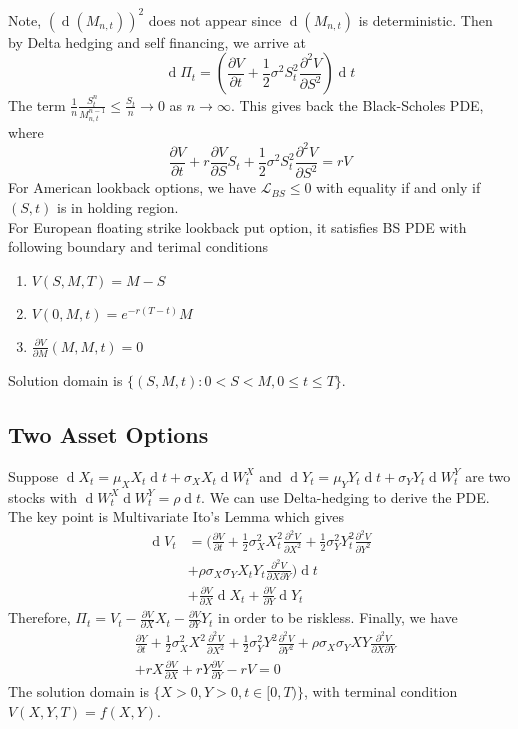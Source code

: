 \documentclass[12pt]{article}
\theoremstyle{definition}
\DeclareMathOperator{\diff}{d}
\begin{document}
Note, $(\diff(M_{n,t}))^2$ does not appear since $\diff(M_{n,t})$ is deterministic. Then by Delta hedging and self financing, we arrive at \[
\diff \Pi_t=(\frac{\partial V}{\partial t}+\frac{1}{2}\sigma^2 S_t^2\frac{\partial^2 V}{\partial S^2})\diff t
\]
The term $\frac{1}{n}\frac{S_t^n}{M_{n,t}^{n-1}}\leq \frac{S_t}{n}\to 0$ as $n\to\infty$. This gives back the Black-Scholes PDE, where
\[
\frac{\partial V}{\partial t}+r\frac{\partial V}{\partial S}S_t +\frac{1}{2}\sigma^2S_t^2\frac{\partial^2 V}{\partial S^2}=rV
\]
For American lookback options, we have $\mathcal{L}_{BS}\leq 0$ with equality if and only if $(S,t)$ is in holding region.\\
For European floating strike lookback put option, it satisfies BS PDE with following boundary and terimal conditions
\begin{enumerate}
	\item $V(S,M,T)=M-S$
	\item $V(0,M,t)=e^{-r(T-t)}M$
	\item $\frac{\partial V}{\partial M}(M,M,t)=0$
\end{enumerate}
Solution domain is $\{(S,M,t): 0<S<M, 0\leq t\leq T\}$.
\subsection{Two Asset Options}
Suppose $\diff X_t = \mu_X X_t\diff t + \sigma_XX_t\diff W_t^X$ and $\diff Y_t = \mu_Y Y_t\diff t + \sigma_YY_t\diff W_t^Y$ are two stocks with $\diff W_t^X\diff W_t^Y=\rho \diff t$. We can use Delta-hedging to derive the PDE. The key point is Multivariate Ito's Lemma which gives
\begin{align*}
\diff V_t &= (\frac{\partial V}{\partial t}+\frac{1}{2}\sigma_X^2 X_t^2\frac{\partial^2 V}{\partial X^2}+\frac{1}{2}\sigma_Y^2 Y_t^2\frac{\partial^2 V}{\partial Y^2}\\
&+\rho\sigma_X\sigma_Y X_tY_t\frac{\partial^2 V}{\partial X\partial Y})\diff t \\
&+\frac{\partial V}{\partial X}\diff X_t+ \frac{\partial V}{\partial Y}\diff Y_t
\end{align*}
Therefore, $\Pi_t=V_t-\frac{\partial V}{\partial X}X_t-\frac{\partial V}{\partial Y}Y_t$ in order to be riskless. Finally, we have
\begin{align*}
&\frac{\partial Y}{\partial t}+\frac{1}{2}\sigma_X^2 X^2\frac{\partial^2 V}{\partial X^2}+\frac{1}{2}\sigma_Y^2 Y^2\frac{\partial^2 V}{\partial Y^2}+\rho \sigma_X\sigma_Y XY\frac{\partial^2 V}{\partial X\partial Y}\\
&+rX\frac{\partial V}{\partial X}+rY\frac{\partial V}{\partial Y}-rV=0
\end{align*}
The solution domain is $\{X>0, Y>0, t\in[0,T)\}$, with terminal condition $V(X,Y,T)=f(X,Y)$.
\end{document}
